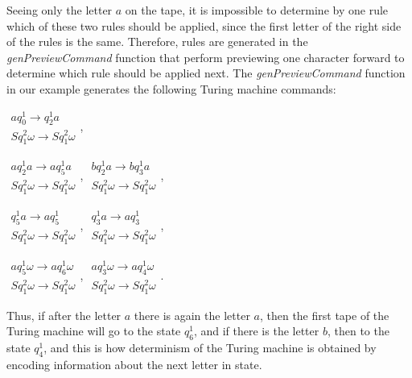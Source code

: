 \documentclass[conference]{IEEEtran}
\theoremstyle{definition}
\begin{document}
Seeing only the letter $ a $ on the tape, it is impossible to determine by one rule which of these two rules should be applied, since the first letter of the right side of the rules is the same. Therefore, rules are generated in the \textit{genPreviewCommand} function that perform previewing one character forward to determine which rule should be applied next. The \textit{genPreviewCommand} function in our example generates the following Turing machine commands:

$\begin{array}{lcl}
    a q_0^1 \to q_2^1 a \\
    S q_1^2 \omega \to S q_1^2 \omega 
\end{array}$,

$\begin{array}{lcl}
    a q_2^1 a \to a q_5^1 a \\
    S q_1^2 \omega \to S q_1^2 \omega 
\end{array}$,
$\begin{array}{lcl}
    b q_2^1 a \to b q_3^1 a \\
    S q_1^2 \omega \to S q_1^2 \omega 
\end{array}$,

$\begin{array}{lcl}
    q_5^1 a \to a q_5^1 \\
    S q_1^2 \omega \to S q_1^2 \omega 
\end{array}$,
$\begin{array}{lcl}
    q_3^1 a \to a q_3^1 \\
    S q_1^2 \omega \to S q_1^2 \omega 
\end{array}$,

$\begin{array}{lcl}
    a q_5^1 \omega \to a q_6^1 \omega \\
    S q_1^2 \omega \to S q_1^2 \omega 
\end{array}$,
$\begin{array}{lcl}
    a q_3^1 \omega \to a q_4^1 \omega \\
    S q_1^2 \omega \to S q_1^2 \omega 
\end{array}$.

Thus, if after the letter $ a $ there is again the letter $ a $, then the first tape of the Turing machine will go to the state $ q_6^1 $, and if there is the letter $ b $, then to the state $ q_4^1 $, and this is how determinism of the Turing machine is obtained by encoding information about the next letter in state.
\end{document}

